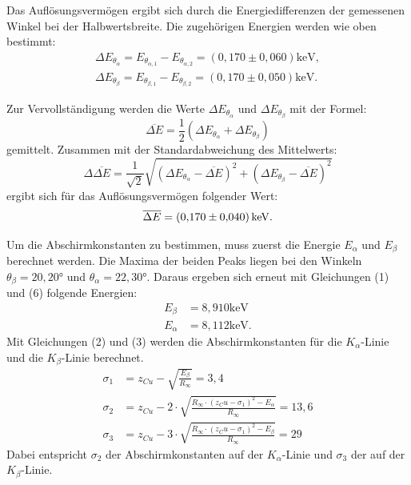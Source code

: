 \noindent Das Auflösungsvermögen ergibt sich durch die Energiedifferenzen der gemessenen Winkel bei der Halbwertsbreite. Die zugehörigen Energien werden wie oben bestimmt:
\begin{align*}
\Delta E_{\theta_{\alpha}} = E_{\theta_{\alpha,1}} - E_{\theta_{\alpha,2}} = (0,170 \pm 0,060) \si{\keV}, \\
\Delta E_{\theta_{\beta}} = E_{\theta_{\beta,1}} - E_{\theta_{\beta,2}} = (0,170 \pm 0,050) \si{\keV}. 
\end{align*}

\noindent Zur Vervollständigung werden die Werte $\Delta E_{\theta_{\alpha}}$ und $\Delta E_{\theta_{\beta}}$ mit der Formel:
\begin{equation}
  \label{eqn:mittelenergie}
  \overline{\Delta E} = \frac{1}{2}(\Delta E_{\theta_{\alpha}} + \Delta E_{\theta_{\beta}})
\end{equation}
gemittelt. Zusammen mit der Standardabweichung des Mittelwerts:
\begin{equation}
  \label{eqn:abweichung}
  \Delta \overline{\Delta E} = \frac{1}{\sqrt{2}}\sqrt{(\Delta E_{\theta_{\alpha}} - \overline{\Delta E})^2 + (\Delta E_{\theta_{\beta}} - \overline{\Delta E})^2}
\end{equation}
ergibt sich für das Auflösungsvermögen folgender Wert:
\begin{align*}
\overline{\Delta E} = (\num{0.170 +- 0.040})\,\si{\kilo\electronvolt}.
\end{align*}


\noindent Um die Abschirmkonstanten zu bestimmen, muss zuerst die Energie $E_\alpha$ und $E_\beta$ berechnet werden. 
Die Maxima der beiden Peaks liegen bei den Winkeln $\theta_{\beta} = 20,20$° und $\theta_{\alpha} = 22,30$°.
Daraus ergeben sich erneut mit Gleichungen (1) und (6) folgende Energien:
\begin{align*}
E_\beta &= 8,910 \si{\keV}\\
E_\alpha &= 8,112 \si{\keV}.
\end{align*}
Mit Gleichungen (2) und (3) werden die Abschirmkonstanten für die $K_{\alpha}$-Linie und die $K_{\beta}$-Linie berechnet.
\begin{align*}
\sigma_1 &= z_{Cu} - \sqrt{\frac{E_\beta}{R_\infty}} = 3,4\\
\sigma_2 &= z_{Cu} - 2 \cdot \sqrt{\frac{R_\infty \cdot (z_Cu - \sigma_1)^2 - E_\alpha}{R_\infty}} = 13,6 \\
\sigma_3 &= z_{Cu} - 3 \cdot \sqrt{\frac{R_\infty \cdot (z_Cu - \sigma_1)^2 - E_\beta}{R_\infty}} = 29
\end{align*}
Dabei entspricht $\sigma_2$ der Abschirmkonstanten auf der $K_{\alpha}$-Linie und $\sigma_3$ der auf der $K_{\beta}$-Linie.

